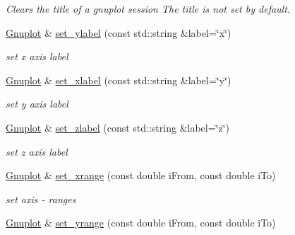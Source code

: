 \begin{DoxyCompactItemize}
\begin{DoxyCompactList}\small\item\em Clears the title of a gnuplot session The title is not set by default. \end{DoxyCompactList}\item 
\hypertarget{classkukadu_1_1Gnuplot_abee1cfd744420fd989db8092acedcc93}{\hyperlink{classkukadu_1_1Gnuplot}{Gnuplot} \& \hyperlink{classkukadu_1_1Gnuplot_abee1cfd744420fd989db8092acedcc93}{set\-\_\-ylabel} (const std\-::string \&label=\char`\"{}x\char`\"{})}\label{classkukadu_1_1Gnuplot_abee1cfd744420fd989db8092acedcc93}

\begin{DoxyCompactList}\small\item\em set x axis label \end{DoxyCompactList}\item 
\hypertarget{classkukadu_1_1Gnuplot_a48b3c2b23f740375b73d27d1906968d0}{\hyperlink{classkukadu_1_1Gnuplot}{Gnuplot} \& \hyperlink{classkukadu_1_1Gnuplot_a48b3c2b23f740375b73d27d1906968d0}{set\-\_\-xlabel} (const std\-::string \&label=\char`\"{}y\char`\"{})}\label{classkukadu_1_1Gnuplot_a48b3c2b23f740375b73d27d1906968d0}

\begin{DoxyCompactList}\small\item\em set y axis label \end{DoxyCompactList}\item 
\hypertarget{classkukadu_1_1Gnuplot_a439a74f49c171b12df1a941a39b3e8c1}{\hyperlink{classkukadu_1_1Gnuplot}{Gnuplot} \& \hyperlink{classkukadu_1_1Gnuplot_a439a74f49c171b12df1a941a39b3e8c1}{set\-\_\-zlabel} (const std\-::string \&label=\char`\"{}z\char`\"{})}\label{classkukadu_1_1Gnuplot_a439a74f49c171b12df1a941a39b3e8c1}

\begin{DoxyCompactList}\small\item\em set z axis label \end{DoxyCompactList}\item 
\hypertarget{classkukadu_1_1Gnuplot_a1e27f156415728196a52946e304f5d1e}{\hyperlink{classkukadu_1_1Gnuplot}{Gnuplot} \& \hyperlink{classkukadu_1_1Gnuplot_a1e27f156415728196a52946e304f5d1e}{set\-\_\-xrange} (const double i\-From, const double i\-To)}\label{classkukadu_1_1Gnuplot_a1e27f156415728196a52946e304f5d1e}

\begin{DoxyCompactList}\small\item\em set axis -\/ ranges \end{DoxyCompactList}\item 
\hypertarget{classkukadu_1_1Gnuplot_a5b27c86aa6c5505aa9b7f65958f1da26}{\hyperlink{classkukadu_1_1Gnuplot}{Gnuplot} \& \hyperlink{classkukadu_1_1Gnuplot_a5b27c86aa6c5505aa9b7f65958f1da26}{set\-\_\-yrange} (const double i\-From, const double i\-To)}\label{classkukadu_1_1Gnuplot_a5b27c86aa6c5505aa9b7f65958f1da26}


\end{DoxyCompactItemize}

